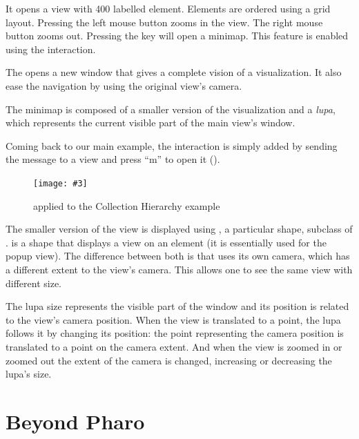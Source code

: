 \documentclass[a4paper,10pt,twoside]{book}
\newcommand{\fig}[4]{
		\begin{figure}[#1]
			\centering
			\texttt{[image: \#3]}
			\caption{\label{fig:#3}#4}
		\end{figure}}
\begin{document}
It opens a view with 400 labelled element. Elements are ordered using a grid layout. Pressing the left mouse button zooms in the view. The right mouse button zooms out. Pressing the  key will open a minimap. This feature is enabled using the  interaction.

The  opens a new window that gives a complete vision of a visualization. It also ease the navigation by using the original view's camera.

The minimap is composed of a smaller version of the visualization and a \emph{lupa}, which represents the current visible part of the main view's window. 


Coming back to our main example, the interaction is simply added by sending the  message to a view and press ``m'' to open it (). 

\fig{H}{0.9}{miniMap}{ applied to the Collection Hierarchy example}

The smaller version of the view is displayed using , a particular shape, subclass of . 
 is a shape that displays a view on an element (it is essentially used for the popup view). The difference between both is that  uses its own camera, which has a different extent to the view's camera. This allows one to see the same view with different size. 

The lupa size represents the visible part of the window and its position is related to the view's camera position. When the view is translated to a point, the lupa follows it by changing its position: the point representing the camera position is translated to a point on the  camera extent. And when the view is zoomed in or zoomed out the extent of the camera is changed, increasing or decreasing the lupa's size.




\section{Beyond Pharo}
\end{document}
